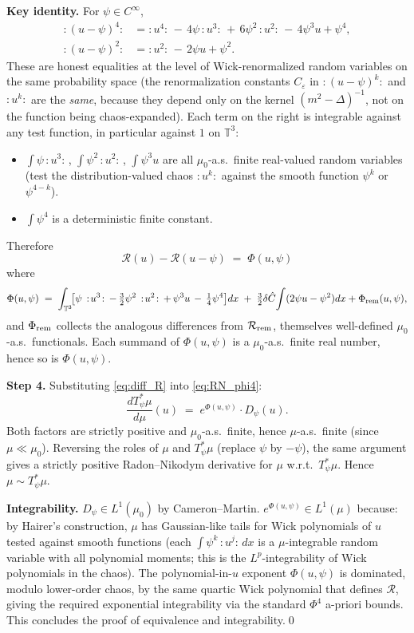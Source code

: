 \textbf{Key identity.}  For $\psi\in C^\infty$,
\begin{align*}
:\!(u-\psi)^4\!: &= :\!u^4\!:\,-\,4\psi\,:\!u^3\!:\,+\,6\psi^2\,:\!u^2\!:\,-\,4\psi^3 u + \psi^4,\\
:\!(u-\psi)^2\!: &= :\!u^2\!:\,-\,2\psi u + \psi^2.
\end{align*}
These are honest equalities at the level of Wick-renormalized random variables on the same probability space (the renormalization constants $C_\varepsilon$ in $:\!(u-\psi)^k\!:$ and $:\!u^k\!:$ are the \emph{same}, because they depend only on the kernel $(m^2-\Delta)^{-1}$, not on the function being chaos-expanded).  Each term on the right is integrable against any test function, in particular against $1$ on $\mathbb T^3$:
\begin{itemize}\setlength\itemsep{2pt}
\item $\int\psi\,:\!u^3\!:\,$, $\int\psi^2\,:\!u^2\!:\,$, $\int\psi^3 u$ are all $\mu_0$-a.s.\ finite real-valued random variables (test the distribution-valued chaos $:\!u^k\!:$ against the smooth function $\psi^k$ or $\psi^{4-k}$).
\item $\int\psi^4$ is a deterministic finite constant.
\end{itemize}

Therefore
\begin{equation}\label{eq:diff_R}
\mathcal R(u)-\mathcal R(u-\psi) \;=\;\Phi(u,\psi)
\end{equation}
where
\[
\Phi(u,\psi)\;=\;\int_{\mathbb T^3}\!\bigl[\psi\,:\!u^3\!:\,-\,\tfrac32\psi^2\,:\!u^2\!:\,+\,\psi^3 u\,-\,\tfrac14\psi^4\bigr]dx \;+\; \tfrac32\delta\hat C\!\int(2\psi u-\psi^2)dx + \Phi_{\rm rem}(u,\psi),
\]
and $\Phi_{\rm rem}$ collects the analogous differences from $\mathcal R_{\rm rem}$, themselves well-defined $\mu_0$-a.s.\ functionals.  Each summand of $\Phi(u,\psi)$ is a $\mu_0$-a.s.\ finite real number, hence so is $\Phi(u,\psi)$.

\textbf{Step 4.}  Substituting \eqref{eq:diff_R} into \eqref{eq:RN_phi4}:
\[
\frac{dT_\psi^*\mu}{d\mu}(u)\;=\;e^{\Phi(u,\psi)}\cdot D_\psi(u).
\]
Both factors are strictly positive and $\mu_0$-a.s.\ finite, hence $\mu$-a.s.\ finite (since $\mu\ll\mu_0$).  Reversing the roles of $\mu$ and $T_\psi^*\mu$ (replace $\psi$ by $-\psi$), the same argument gives a strictly positive Radon--Nikodym derivative for $\mu$ w.r.t.\ $T_\psi^*\mu$.  Hence $\mu\sim T_\psi^*\mu$.

\medskip
\noindent\textbf{Integrability.}  $D_\psi\in L^1(\mu_0)$ by Cameron--Martin.  $e^{\Phi(u,\psi)}\in L^1(\mu)$ because: by Hairer's construction, $\mu$ has Gaussian-like tails for Wick polynomials of $u$ tested against smooth functions (each $\int\psi^k\,:\!u^j\!:\,dx$ is a $\mu$-integrable random variable with all polynomial moments; this is the $L^p$-integrability of Wick polynomials in the chaos).  The polynomial-in-$u$ exponent $\Phi(u,\psi)$ is dominated, modulo lower-order chaos, by the same quartic Wick polynomial that defines $\mathcal R$, giving the required exponential integrability via the standard $\Phi^4$ a-priori bounds.  This concludes the proof of equivalence and integrability.\qed

